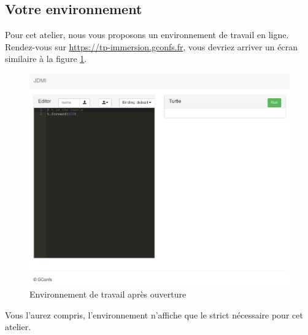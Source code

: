 \documentclass[11pt,a4paper]{article}
\begin{document}
\subsection{Votre environnement}

Pour cet atelier, nous vous proposons un environnement de travail en ligne.
Rendez-vous sur \url{https://tp-immersion.gconfs.fr}, vous devriez arriver un
écran similaire à la figure \ref{fig:zeleinterfacestart}.

\begin{figure}
    \centering
    \includegraphics[width=\textwidth]{img/zele-interface_start}
    \caption{Environnement de travail après ouverture}
    \label{fig:zeleinterfacestart}
\end{figure}

Vous l'aurez compris, l'environnement n'affiche que le strict nécessaire pour
cet atelier.
\end{document}
